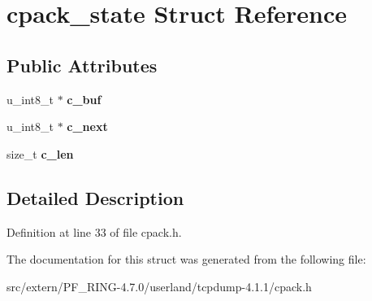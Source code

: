 \hypertarget{structcpack__state}{
\section{cpack\_\-state Struct Reference}
\label{structcpack__state}
}
\subsection*{Public Attributes}
\begin{DoxyCompactItemize}
\item 
\hypertarget{structcpack__state_a399854368d96b696437db3ebeb149100}{
u\_\-int8\_\-t $\ast$ {\bfseries c\_\-buf}}
\label{structcpack__state_a399854368d96b696437db3ebeb149100}

\item 
\hypertarget{structcpack__state_a94d05f6a80b172ea305ce96e31d1834e}{
u\_\-int8\_\-t $\ast$ {\bfseries c\_\-next}}
\label{structcpack__state_a94d05f6a80b172ea305ce96e31d1834e}

\item 
\hypertarget{structcpack__state_ad6fb7301ff535358fbc6640549e68110}{
size\_\-t {\bfseries c\_\-len}}
\label{structcpack__state_ad6fb7301ff535358fbc6640549e68110}

\end{DoxyCompactItemize}


\subsection{Detailed Description}


Definition at line 33 of file cpack.h.



The documentation for this struct was generated from the following file:\begin{DoxyCompactItemize}
\item 
src/extern/PF\_\-RING-\/4.7.0/userland/tcpdump-\/4.1.1/cpack.h\end{DoxyCompactItemize}
